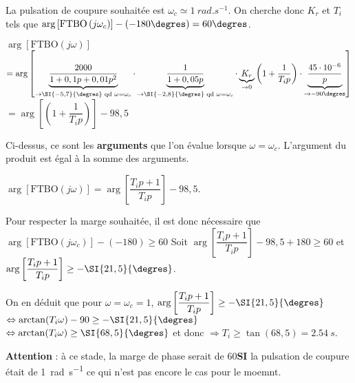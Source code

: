 \begin{multicols}{2}
\normalsize 

\ifprof
\begin{corrige}
La pulsation de coupure souhaitée est $\omega_c \simeq \SI{1}{rad.s^{-1}}$. 
On cherche donc $K_r$ et $T_i$ tels que $\arg \left[\text{FTBO}\left( j \omega_c\right)\right]-\left(-180\degres\right)=60\degres$.

$\arg \left[\text{FTBO}\left( j \omega\right)\right]$ 
$ = \arg \left[
\underbrace{\dfrac{2000}{1+0,1p+0,01p^2}}_{\to \SI{-5,7}{\degres} \text{ qd } \omega=\omega_c} 
\cdot
\underbrace{\dfrac{1}{1+0,05p}}_{\to \SI{-2,8}{\degres} \text{ qd } \omega=\omega_c} 
\cdot 
 \underbrace{K_r}_{\to 0}
 \left(1+\dfrac{1}{T_i p} \right) \cdot 
\underbrace{\dfrac{45\cdot 10^{-6}}{p}}_{\to -90\degres } 
\right] $
$ = \arg \left[  \left(1+\dfrac{1}{T_i p} \right) \right] -98,5$

\begin{rem}
Ci-dessus, ce sont les \textbf{arguments} que l'on évalue lorsque $\omega=\omega_c$. L'argument du produit est égal à la somme des arguments.
\end{rem}
$ \arg \left[\text{FTBO}\left( j \omega\right)\right] = \arg \left[  \dfrac{T_i p+1}{T_i p}  \right]-98,5 $.

Pour respecter la marge souhaitée, il est donc nécessaire que 
$\arg \left[\text{FTBO}\left( j \omega_c\right)\right]-\left(-180\right)\geq60$
Soit 
$\arg \left[  \dfrac{T_i p+1}{T_i p}  \right]-98,5+ 180 \geq60$ 
et $\arg \left[  \dfrac{T_i p+1}{T_i p}  \right] \geq - \SI{21,5}{\degres}$.
 
\end{corrige}
\else
\fi


\ifprof
\begin{corrige}
On en déduit que pour $\omega=\omega_c=1$, 
$\arg \left[  \dfrac{T_i p+1}{T_i p}  \right] \geq - \SI{21,5}{\degres}$
$ \Leftrightarrow  \arctan (T_i \omega) -90 \geq - \SI{21,5}{\degres}$ 
$ \Leftrightarrow  \arctan (T_i \omega)  \geq \SI{68,5}{\degres}$ 
et donc $\Rightarrow  T_i \geq \tan(68,5)=\SI{2,54}{s}$.
 

 \begin{warn}
\textbf{Attention} : à ce stade, la marge de phase serait de 60\degres \textbf{SI} la pulsation de  coupure était de \SI{1}{rad.s^{-1}} ce qui n'est pas encore le cas pour le moemnt.
 \end{warn}
 

\end{corrige}
\end{multicols}
